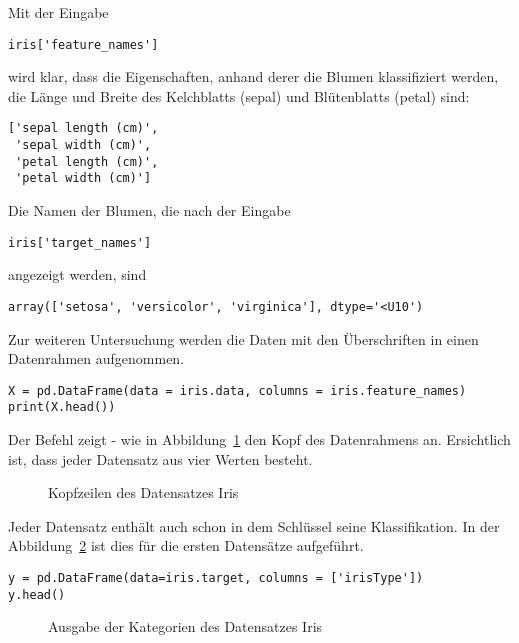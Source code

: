 Mit der Eingabe

\begin{verbatim}
iris['feature_names']
\end{verbatim}

wird klar, dass die Eigenschaften, anhand derer die Blumen klassifiziert werden, die Länge und Breite des Kelchblatts (sepal) und Blütenblatts (petal) sind:

\begin{lstlisting}[numbers=none]
['sepal length (cm)',
 'sepal width (cm)',
 'petal length (cm)',
 'petal width (cm)']
\end{lstlisting}

Die Namen der Blumen, die nach der Eingabe
\begin{verbatim}
iris['target_names']
\end{verbatim}

angezeigt werden, sind

\begin{lstlisting}[numbers=none]
array(['setosa', 'versicolor', 'virginica'], dtype='<U10')
\end{lstlisting}

Zur weiteren Untersuchung werden die Daten mit den Überschriften in einen Datenrahmen aufgenommen.

\begin{verbatim}
X = pd.DataFrame(data = iris.data, columns = iris.feature_names)
print(X.head())
\end{verbatim}

Der Befehl  zeigt - wie in Abbildung~\ref{TensorFlowHead} den Kopf des Datenrahmens an.
Ersichtlich ist, dass jeder Datensatz aus vier Werten besteht. 

\begin{figure}[H]
	\caption{Kopfzeilen des Datensatzes Iris}\label{TensorFlowHead}
\end{figure}

Jeder Datensatz enthält auch schon in dem Schlüssel  seine Klassifikation. In der 
Abbildung~\ref{TensorFlowHeadType} ist dies für die ersten Datensätze aufgeführt.

\begin{verbatim}
y = pd.DataFrame(data=iris.target, columns = ['irisType'])
y.head()
\end{verbatim}

\begin{figure}[H]
	\caption{Ausgabe der Kategorien des Datensatzes Iris}\label{TensorFlowHeadType}
\end{figure}

